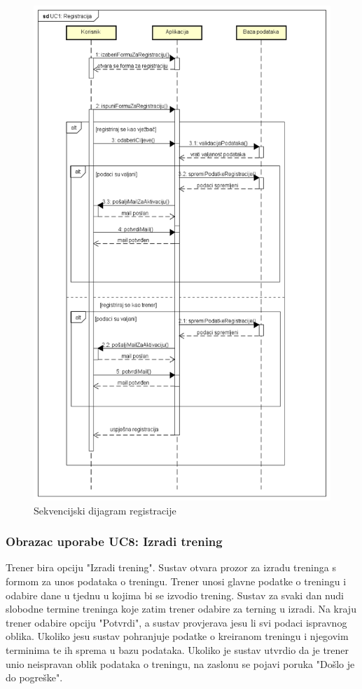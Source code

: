                 \begin{figure}[H]
		              \includegraphics[scale=0.55]{./Dijagrami/UC1_Registracija.png}
		              \centering
		              \caption{Sekvencijski dijagram registracije}
		              \label{fig:promjene}
	            \end{figure}

                \subsubsection{Obrazac uporabe UC8: Izradi trening}
				\noindent Trener bira opciju "Izradi trening". Sustav otvara prozor za izradu treninga s formom za unos podataka o treningu. Trener unosi glavne podatke o treningu i odabire dane u tjednu u kojima bi se izvodio trening. Sustav za svaki dan nudi slobodne termine treninga koje zatim trener odabire za terning u izradi. Na kraju trener odabire opciju "Potvrdi", a sustav provjerava jesu li svi podaci ispravnog oblika. Ukoliko jesu sustav pohranjuje podatke o kreiranom treningu i njegovim terminima te ih sprema u bazu podataka. Ukoliko je sustav utvrdio da je trener unio neispravan oblik podataka o treningu, na zaslonu se pojavi poruka "Došlo je do pogreške".   

